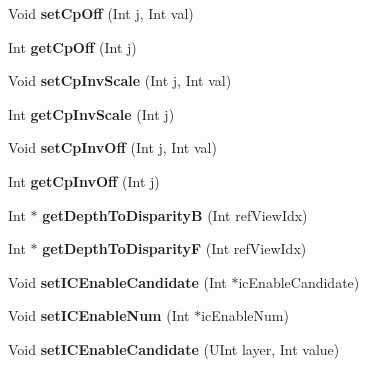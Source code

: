 \begin{DoxyCompactItemize}
Void {\bfseries set\+Cp\+Off} (Int j, Int val)
\item 
\mbox{\label{class_t_com_slice_a84609257e3292e18ed8081a06e3ed55d}} 
Int {\bfseries get\+Cp\+Off} (Int j)
\item 
\mbox{\label{class_t_com_slice_a48bcb98610c4412953efde44af048ba4}} 
Void {\bfseries set\+Cp\+Inv\+Scale} (Int j, Int val)
\item 
\mbox{\label{class_t_com_slice_a86f53646186d9ae8fadb8a02e1953fe0}} 
Int {\bfseries get\+Cp\+Inv\+Scale} (Int j)
\item 
\mbox{\label{class_t_com_slice_ae78e4f3bcf2d5d88bcff960c6029a560}} 
Void {\bfseries set\+Cp\+Inv\+Off} (Int j, Int val)
\item 
\mbox{\label{class_t_com_slice_a5b1249c20f99aa35fd982fc7145c9245}} 
Int {\bfseries get\+Cp\+Inv\+Off} (Int j)
\item 
\mbox{\label{class_t_com_slice_a0abcafcd2203d726c7a72fe3b1033eda}} 
Int $\ast$ {\bfseries get\+Depth\+To\+DisparityB} (Int ref\+View\+Idx)
\item 
\mbox{\label{class_t_com_slice_a5c538c26f30249cfb15f9810d9cb846e}} 
Int $\ast$ {\bfseries get\+Depth\+To\+DisparityF} (Int ref\+View\+Idx)
\item 
\mbox{\label{class_t_com_slice_a2163e3a96570e4bfbba6dafc388f2419}} 
Void {\bfseries set\+I\+C\+Enable\+Candidate} (Int $\ast$ic\+Enable\+Candidate)
\item 
\mbox{\label{class_t_com_slice_a224f52e16d9aafb52f9e967ff931b1ed}} 
Void {\bfseries set\+I\+C\+Enable\+Num} (Int $\ast$ic\+Enable\+Num)
\item 
\mbox{\label{class_t_com_slice_a55f1d478da4b64568298015063df849e}} 
Void {\bfseries set\+I\+C\+Enable\+Candidate} (U\+Int layer, Int value)
\item 
\mbox{\label{class_t_com_slice_a24f6c6def4bfaff57cc6554afe07c401}} 

\end{DoxyCompactItemize}
